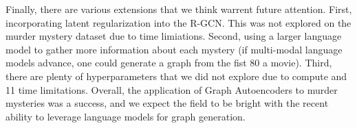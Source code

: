 \documentclass[11pt]{article}
\theoremstyle{definition}
\begin{document}
Finally, there are various extensions that we think warrent future attention. First, incorporating
latent regularization into the R-GCN. This was not explored on the murder mystery dataset due
to time limiations. Second, using a larger language model to gather more information about each
mystery (if multi-modal language models advance, one could generate a graph from the fist 80%
a movie). Third, there are plenty of hyperparameters that we did not explore due to compute and
11
time limitations.
Overall, the application of Graph Autoencoders to murder mysteries was a success, and we
expect the field to be bright with the recent ability to leverage language models for graph generation.

\end{document}
